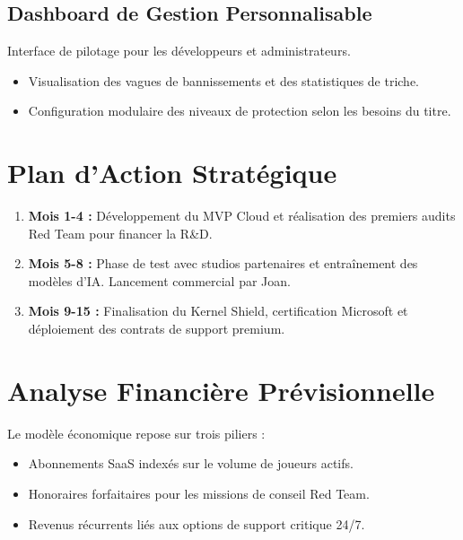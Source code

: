 \documentclass[12pt,a4paper]{article}
\begin{document}
\subsection{Dashboard de Gestion Personnalisable}
Interface de pilotage pour les développeurs et administrateurs.
\begin{itemize}
    \item Visualisation des vagues de bannissements et des statistiques de triche.
    \item Configuration modulaire des niveaux de protection selon les besoins du titre.
\end{itemize}

\section{Plan d'Action Stratégique}
\begin{enumerate}
    \item \textbf{Mois 1-4 :} Développement du MVP Cloud et réalisation des premiers audits Red Team pour financer la R\&D.
    \item \textbf{Mois 5-8 :} Phase de test avec studios partenaires et entraînement des modèles d'IA. Lancement commercial par Joan.
    \item \textbf{Mois 9-15 :} Finalisation du Kernel Shield, certification Microsoft et déploiement des contrats de support premium.
\end{enumerate}

\section{Analyse Financière Prévisionnelle}
Le modèle économique repose sur trois piliers :
\begin{itemize}
    \item Abonnements SaaS indexés sur le volume de joueurs actifs.
    \item Honoraires forfaitaires pour les missions de conseil Red Team.
    \item Revenus récurrents liés aux options de support critique 24/7.
\end{itemize}
\end{document}
